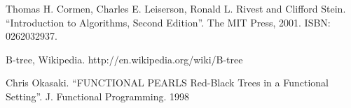 \documentclass[b5paper]{article}
\begin{document}
\ifx\wholebook\relax \else
\begin{thebibliography}{99}

Thomas H. Cormen, Charles E. Leiserson, Ronald L. Rivest and Clifford Stein. ``Introduction to Algorithms, Second Edition''. The MIT Press, 2001. ISBN: 0262032937.

B-tree, Wikipedia. http://en.wikipedia.org/wiki/B-tree

Chris Okasaki. ``FUNCTIONAL PEARLS Red-Black Trees in a Functional Setting''. J. Functional Programming. 1998

\end{thebibliography}

\expandafter\enddocument
\fi
\end{document}
